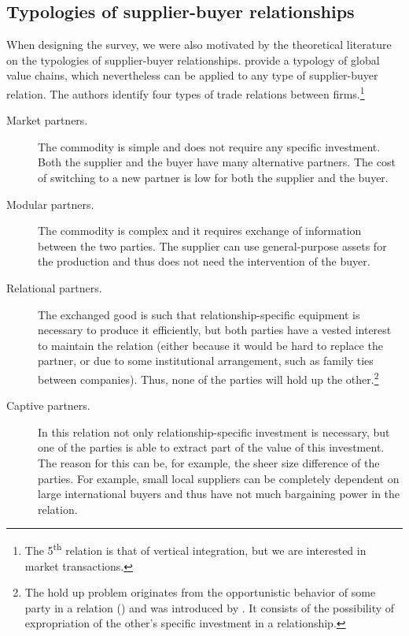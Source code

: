 \usepackage{}\documentclass[final, dvipsnames, authoryear,12pt]{elsarticle}
\begin{document}
\subsection{Typologies of supplier-buyer relationships}
\label{sec:typologies}

When designing the survey, we were also motivated by the theoretical literature on the typologies of supplier-buyer relationships.  \cite{gereffi2005governance} provide a typology of global value chains, which nevertheless can be applied to any type of supplier-buyer relation. The authors identify four types of trade relations between firms.\footnote{The 5\textsuperscript{th} relation is that of vertical integration, but we are interested in market transactions.}

\begin{description}
    \item[Market partners.] The commodity is simple and does not require any specific investment. Both the supplier and the buyer have many alternative partners. The cost of switching to a new partner is low for both the supplier and the buyer.
    \item[Modular partners.] The commodity is complex and it requires exchange of information between the two parties. The supplier can use general-purpose assets for the production and thus does not need the intervention of the buyer.
    \item[Relational partners.] The exchanged good is such that relationship-specific equipment is necessary to produce it efficiently, but both parties have a vested interest to maintain the relation (either because it would be hard to replace the partner, or due to some institutional arrangement, such as family ties between companies). Thus, none of the parties will hold up the other.\footnote{The hold up problem originates from the opportunistic behavior of some party in a relation (\cite{williamson2007economic}) and was introduced by \cite{grossman1986costs}. It consists of the possibility of expropriation of the other's specific investment in a relationship.}
    \item[Captive partners.] In this relation not only relationship-specific investment is necessary, but one of the parties is able to extract part of the value of this investment. The reason for this can be, for example, the sheer size difference of the parties. For example, small local suppliers can be completely dependent on large international buyers and thus have not much bargaining power in the relation.
\end{description}
\end{document}
